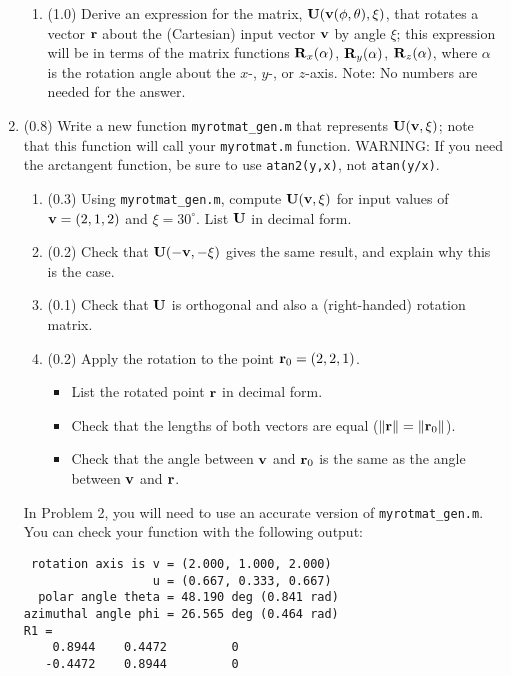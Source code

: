 \documentclass[11pt,titlepage,fleqn]{article}
\newcommand{\rotangA}{\alpha}
\newcommand{\rotangB}{\xi}    %
\newcommand{\rotvec}{\bv}      %
\begin{document}
\begin{enumerate}
\begin{enumerate}
\item (1.0) Derive an expression for the matrix, $\bU(\rotvec(\phi,\theta),\rotangB)$, that rotates a vector $\mbox{${\bf r}$}$ about the (Cartesian) input vector $\rotvec$ by angle $\rotangB$; this expression will be in terms of the matrix functions $\bR_x(\rotangA)$, $\bR_y(\rotangA)$, $\bR_z(\rotangA)$, where $\rotangA$ is the rotation angle about the $x$-, $y$-, or $z$-axis. Note: No numbers are needed for the answer.

\end{enumerate}

\item (0.8) Write a new function \verb+myrotmat_gen.m+ that represents $\bU(\rotvec,\rotangB)$; note that this function will call your \verb+myrotmat.m+ function. WARNING: If you need the arctangent function, be sure to use \verb+atan2(y,x)+, not \verb+atan(y/x)+.
%
\begin{enumerate}
\item (0.3) Using \verb+myrotmat_gen.m+, compute $\bU(\rotvec,\rotangB)$ for input values of $\rotvec = (2,1,2)$ and $\rotangB = 30^\circ$. List $\mbox{${\bf U}$}$ in decimal form.
\item (0.2) Check that $\bU(-\rotvec,-\rotangB)$ gives the same result, and explain why this is the case.
\item (0.1) Check that $\mbox{${\bf U}$}$ is orthogonal and also a (right-handed) rotation matrix.
\item (0.2) Apply the rotation to the point $\mbox{${\bf r}$}_0 = (2,2,1)$.
%
\begin{itemize}
\item List the rotated point $\mbox{${\bf r}$}$ in decimal form.
\item Check that the lengths of both vectors are equal ($\|\mbox{${\bf r}$}\| = \|\mbox{${\bf r}$}_0\|$).
\item Check that the angle between $\rotvec$ and $\mbox{${\bf r}$}_0$ is the same as the angle between  $\rotvec$ and $\mbox{${\bf r}$}$.
\end{itemize}
\end{enumerate}
%
In Problem 2, you will need to use an accurate version of \verb+myrotmat_gen.m+. You can check your function with the following output:
%
\begin{spacing}{1.0}
\begin{verbatim}
 rotation axis is v = (2.000, 1.000, 2.000)
                  u = (0.667, 0.333, 0.667)
  polar angle theta = 48.190 deg (0.841 rad)
azimuthal angle phi = 26.565 deg (0.464 rad)
R1 =
    0.8944    0.4472         0
   -0.4472    0.8944         0

\end{verbatim}
\end{spacing}
\end{enumerate}
\end{document}
